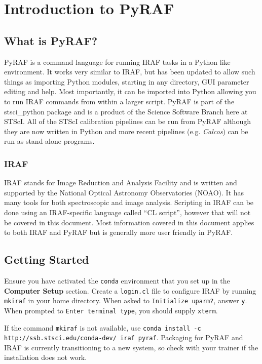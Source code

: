 \chapter{Introduction to PyRAF}
\label{cha:chapter2}


 
\section{What is PyRAF? }
PyRAF is a command language for running IRAF tasks in a Python like environment. It works very similar to IRAF, but has been updated to allow such things as importing Python modules, starting in any directory, GUI parameter editing and help. Most importantly, it can be imported into Python allowing you to run IRAF commands from within a larger script. PyRAF is part of the stsci\_python package and is a product of the Science Software Branch here at STScI. All of the STScI calibration pipelines can be run from PyRAF although they are now written in Python and more recent pipelines (e.g. \emph{Calcos}) can be run as stand-alone programs.

\subsection{IRAF}
IRAF stands for Image Reduction and Analysis Facility and is written and supported by the National Optical Astronomy Observatories (NOAO). It has many tools for both spectroscopic and image analysis. Scripting in IRAF can be done using an IRAF-specific language called ``CL script'', however that will not be covered in this document. Most information covered in this document applies to both IRAF and PyRAF but is generally more user friendly in PyRAF.

\section{Getting Started}

Ensure you have activated the {\tt conda} environment that you set up in the {\bf Computer Setup} section. Create a {\tt login.cl} file to configure IRAF by running {\tt mkiraf} in your home directory. When asked to {\tt Initialize uparm?}, answer {\tt y}. When prompted to {\tt Enter terminal type}, you should supply {\tt xterm}.

If the command {\tt mkiraf} is not available, use {\tt conda install -c http://ssb.stsci.edu/conda-dev/ iraf pyraf}. Packaging for PyRAF and IRAF is currently transitioning to a new system, so check with your trainer if the installation does not work.


